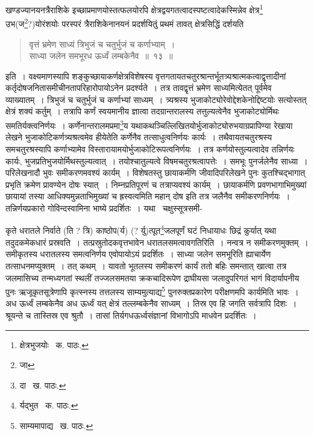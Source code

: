 \documentclass[11pt, openany]{book}
\begin{document}
खण्डज्यानयनत्रैराशिके इच्छाप्रमाणयोस्तत्फलयोरपि क्षेत्रद्वयगतत्वादस्पष्टत्वादेकस्मिन्नेव क्षेत्र\renewcommand{\thefootnote}{१}\footnote{क्षेत्रभुजयोः \textendash\ क. पाठः.} उभ(ज\renewcommand{\thefootnote}{२}\footnote{जा}?)योरंशयोः परस्परं
त्रैराशिकेनानयनं प्रदर्शयितुं प्रथमं तावत् क्षेत्रसिद्धिं दर्शयति\textendash 

\begin{quote}
{\ab वृत्तं भ्रमेण साध्यं त्रिभुजं च चतुर्भुजं च कर्णाभ्याम्~।\\
साध्या जलेन समभूरध ऊर्ध्वं लम्बकेनैव~॥~१३~॥}
\end{quote}

इति~। वक्ष्यमाणस्यापि शङ्कुच्छायाकर्णक्षेत्रविशेषस्य वृत्तगतायतचतुरश्रान्तर्भूतत्र्यश्रात्मकत्वाद्वृत्तादीनां कर्तृदोषजनितासमीचीनतापरिहारोपायोऽनेन प्रदर्श्यते~। तत्र तावद्वृत्तं भ्रमेण साध्यमित्येतत् पूर्वमेव व्याख्यातम्~। त्रिभुजं च चतुर्भुजं च कर्णाभ्यां साध्यम्~। त्र्यश्रस्य भुजाकोट्योरेवोद्देशकेनोद्दिष्टयोः सत्योस्तत् क्षेत्रं शक्यं कर्तुम्~। तत्रापि कर्णं स्वयमानीय ज्ञात्वा तदग्रान्तरालस्य तत्तुल्यत्वेनैव भुजाकोट्योर्मिथः
समतिर्यक्त्वनिर्णयः~। कर्णेनान्तरालमप्रमा\renewcommand{\thefootnote}{३}\footnote{दा \textendash\ ख. पाठः.}य यथाकथञ्चिल्लिखितयोर्भुजाकोट्योरुभयाग्रप्रापिण्या रेखाया लेखने भुजाकोटिकर्णत्र्यश्रत्वमेव हीयेतेति कर्णेनैव तत्साधुत्वनिर्णयः कार्यः~। तथैवायतचतुरश्रस्य समचतुरश्रस्यापि कर्णाभ्यामेव विस्तारायामयोर्भुजाकोटिरूपत्वनिर्णयः~। तत्र कर्णयोस्तुल्यत्वादेव
तन्निर्णयः कार्यः, भुजप्रतिभुजयोर्मिथस्तुल्यत्वात्~। तयोश्चातुल्यत्वे विषमचतुरश्रत्वापत्तेः~। समभूः पुनर्जलेनैव साध्या~। परिलेखनादौ भुवः समीकरणमवश्यं कार्यम्~। विशेषतस्तु छायाकर्मणि जीवादिपरिलेखने पुनः कुतश्चिद्भागात् प्रभृति क्रमेण प्रावण्येन दोषः स्यात्~। निम्नप्रतिपूरणं च
तत्राप्यवश्यं कार्यम्~। छायाकर्मणि प्रवणभागाभिमुख्यां छायायां तस्या आधिक्यमुन्नताभिमुख्यां च ह्रस्वत्वमिति महान् दोष इति तत्र जलैनैव समीकरणनिर्णयः~। तन्निर्णयप्रकारो गोविन्दस्वामिना भाष्ये प्रदर्शितः~। यथा \textendash\ चक्षुस्सूत्रसमी-

\newpage

\noindent कृते धरातले निर्वाते (ति ? त्रि) काष्ठोप(र्य) (? र्यु)त्पूत\renewcommand{\thefootnote}{१}\footnote{र्यद्भुत \textendash\ क. पाठः.}जलपूर्णं घटं निधायाधः छिद्रं कुर्यात् यथा तदुदकमेकधारं प्रस्रवति~। तत्प्रस्रुतोदकवृत्तभावेन धरातलसमत्वावगतिरिति~। नन्वत्र न समीकरणमुक्तम्~। समीकृतस्य धरातलस्य समत्वनिर्णय एवोपायोऽयं प्रदर्शितः~। {\qt साध्या जलेन समभूरि}ति ह्याचार्येण तत्साधनमप्युक्तम्~। तत् कथम्~। यावतो भूतलस्य समीकरणं कार्यं ततो बहिः समन्तात् खात्वा तत्र जलमासिच्य तन्मध्यगतां स्थलीं तज्जलसमतया क्रकचादिरूपेण द्राघीयसा जलादुपरिगतं भागं विदार्यापनीय पुनः ऋजूकृतसूत्रेणापि कृत्स्नस्य तत्तलस्य साम्यमुत्याद्य\renewcommand{\thefootnote}{२}\footnote{साम्यमापाद्य \textendash\ ख. पाठः.} पुनरुक्तप्रकारेण परीक्षणमपि कार्यमिति भावः~। अध ऊर्ध्वं लम्बकेनैव अध ऊर्ध्वं यत् क्षेत्रं तल्लम्बकेनैव साध्यम्~। तिस्र एव हि जगति सर्वत्रापि दिशः~। श्रूयन्ते च तास्तिस्र एव श्रुतौ~। तासां तिर्यगधऊर्ध्वसंज्ञानां विभागोऽपि माधवेन प्रदर्शितः~।
\end{document}
